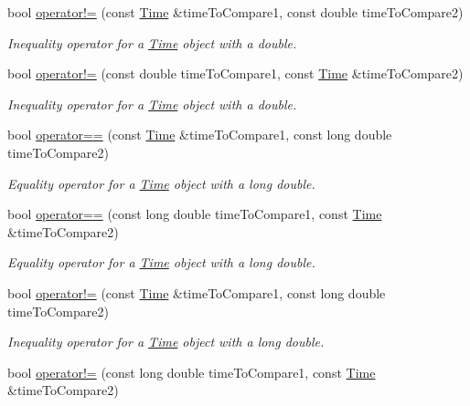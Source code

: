 \begin{DoxyCompactItemize}
bool \hyperlink{classtudat_1_1Time_ae5b5c0b139267fb22496536f8d7cf668}{operator!=} (const \hyperlink{classtudat_1_1Time}{Time} \&time\+To\+Compare1, const double time\+To\+Compare2)
\begin{DoxyCompactList}\small\item\em Inequality operator for a \hyperlink{classtudat_1_1Time}{Time} object with a double. \end{DoxyCompactList}\item 
bool \hyperlink{classtudat_1_1Time_a1fcbf4e711d6e6d302cee7e79a16b215}{operator!=} (const double time\+To\+Compare1, const \hyperlink{classtudat_1_1Time}{Time} \&time\+To\+Compare2)
\begin{DoxyCompactList}\small\item\em Inequality operator for a \hyperlink{classtudat_1_1Time}{Time} object with a double. \end{DoxyCompactList}\item 
bool \hyperlink{classtudat_1_1Time_af9a670966fe04d7b51b7239175f264c1}{operator==} (const \hyperlink{classtudat_1_1Time}{Time} \&time\+To\+Compare1, const long double time\+To\+Compare2)
\begin{DoxyCompactList}\small\item\em Equality operator for a \hyperlink{classtudat_1_1Time}{Time} object with a long double. \end{DoxyCompactList}\item 
bool \hyperlink{classtudat_1_1Time_a4add1bc319981108bbe81d607295cce2}{operator==} (const long double time\+To\+Compare1, const \hyperlink{classtudat_1_1Time}{Time} \&time\+To\+Compare2)
\begin{DoxyCompactList}\small\item\em Equality operator for a \hyperlink{classtudat_1_1Time}{Time} object with a long double. \end{DoxyCompactList}\item 
bool \hyperlink{classtudat_1_1Time_a15a040eb084c1f7af77be007cd72257a}{operator!=} (const \hyperlink{classtudat_1_1Time}{Time} \&time\+To\+Compare1, const long double time\+To\+Compare2)
\begin{DoxyCompactList}\small\item\em Inequality operator for a \hyperlink{classtudat_1_1Time}{Time} object with a long double. \end{DoxyCompactList}\item 
bool \hyperlink{classtudat_1_1Time_ad75349422ac4b7e127b5fc666d094f3b}{operator!=} (const long double time\+To\+Compare1, const \hyperlink{classtudat_1_1Time}{Time} \&time\+To\+Compare2)

\end{DoxyCompactItemize}
